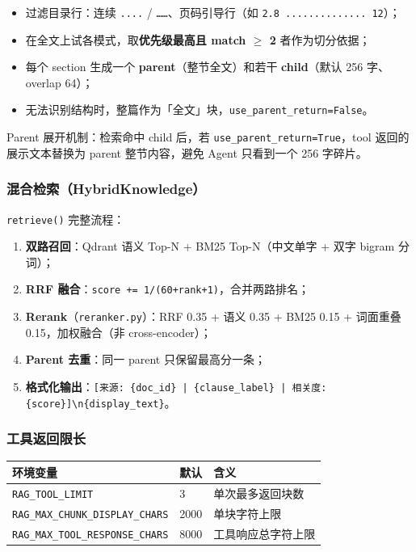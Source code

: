 \documentclass[11pt,a4paper]{ctexart}
\begin{document}
\begin{itemize}[nosep]
  \item 过滤目录行：连续 \texttt{....} / \texttt{……}、页码引导行（如 \texttt{2.8 .............. 12}）；
  \item 在全文上试各模式，取\textbf{优先级最高且 match $\geq$ 2} 者作为切分依据；
  \item 每个 section 生成一个 \textbf{parent}（整节全文）和若干 \textbf{child}（默认 256 字、overlap 64）；
  \item 无法识别结构时，整篇作为「全文」块，\texttt{use\_parent\_return=False}。
\end{itemize}

Parent 展开机制：检索命中 child 后，若 \texttt{use\_parent\_return=True}，tool 返回的展示文本替换为 parent 整节内容，避免 Agent 只看到一个 256 字碎片。

\subsubsection{混合检索（HybridKnowledge）}

\texttt{retrieve()} 完整流程：

\begin{enumerate}[nosep]
  \item \textbf{双路召回}：Qdrant 语义 Top-N + BM25 Top-N（中文单字 + 双字 bigram 分词）；
  \item \textbf{RRF 融合}：\texttt{score += 1/(60+rank+1)}，合并两路排名；
  \item \textbf{Rerank}（\texttt{reranker.py}）：RRF 0.35 + 语义 0.35 + BM25 0.15 + 词面重叠 0.15，加权融合（非 cross-encoder）；
  \item \textbf{Parent 去重}：同一 parent 只保留最高分一条；
  \item \textbf{格式化输出}：\texttt{[来源: \{doc\_id\} | \{clause\_label\} | 相关度: \{score\}]\textbackslash n\{display\_text\}}。
\end{enumerate}

\subsubsection{工具返回限长}

\begin{center}
\begin{tabular}{lll}
\toprule
\textbf{环境变量} & \textbf{默认} & \textbf{含义} \\
\midrule
\texttt{RAG\_TOOL\_LIMIT} & 3 & 单次最多返回块数 \\
\texttt{RAG\_MAX\_CHUNK\_DISPLAY\_CHARS} & 2000 & 单块字符上限 \\
\texttt{RAG\_MAX\_TOOL\_RESPONSE\_CHARS} & 8000 & 工具响应总字符上限 \\
\bottomrule
\end{tabular}
\end{center}
\end{document}
